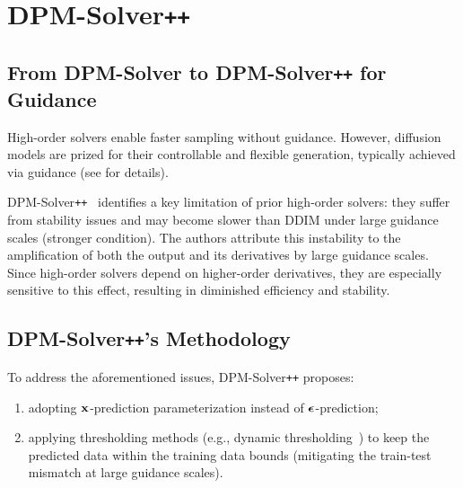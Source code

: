 \clearpage
\newpage

\section{\texorpdfstring{DPM-Solver\texttt{++}}{DPM-Solver\texttt{++}}}\label{sec:dpm++}


\subsection{From DPM-Solver to DPM-Solver\texttt{++} for Guidance}
High-order solvers enable faster sampling without guidance. However, diffusion models are prized for their controllable and flexible generation, typically achieved via guidance (see  for details).

DPM-Solver\texttt{++}~\citep{lu2022dpm2} identifies a key limitation of prior high-order solvers: they suffer from stability issues and may become slower than DDIM under large guidance scales (stronger condition). The authors attribute this instability to the amplification of both the output and its derivatives by large guidance scales. Since high-order solvers depend on higher-order derivatives, they are especially sensitive to this effect, resulting in diminished efficiency and stability.


\subsection{DPM-Solver\texttt{++}'s Methodology}
To address the aforementioned issues, DPM-Solver\texttt{++} proposes:
\begin{enumerate}
    \item adopting ${\mathbf{x}}$-prediction parameterization instead of ${\bm{\epsilon}}$-prediction;
    \item applying thresholding methods (e.g., dynamic thresholding~\citep{saharia2022photorealistic}) to keep the predicted data within the training data bounds (mitigating the train-test mismatch at large guidance scales).
\end{enumerate}

